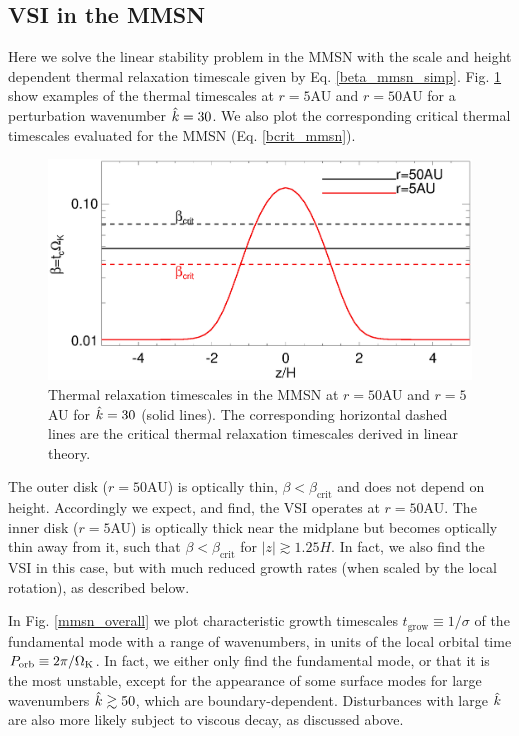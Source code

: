 {\subsection{VSI in the MMSN}
Here we solve the linear stability problem in the MMSN with the scale and
height dependent thermal relaxation timescale given by
Eq. \ref{beta_mmsn_simp}.  Fig. \ref{beta_compare} show examples of
the thermal timescales at $r=5$AU and $r=50$AU for a
perturbation wavenumber $\hat{k}=30$. We also plot the 
corresponding critical thermal timescales evaluated for the MMSN
(Eq. \ref{bcrit_mmsn}).  
 \begin{figure}
  \includegraphics[width=\linewidth,clip=true,trim=0cm 0cm 0cm
  0cm]{figures/beta_compare}
  \caption{Thermal relaxation timescales in the MMSN at $r=50$AU
    and $r=5$AU for $\hat{k}=30$ (solid lines). The
    corresponding horizontal dashed lines are the critical thermal
    relaxation timescales derived in linear theory. 
    \label{beta_compare}}
\end{figure}

The outer disk ($r=50$AU) is optically thin,
$\beta<\beta_\mathrm{crit}$  and  does not depend on height.
Accordingly we expect, and find, the VSI operates at $r=50$AU. The
inner disk ($r=5$AU) is optically thick near the midplane but becomes
optically thin away from it, such that $\beta < \beta_\mathrm{crit}$
for $|z|\gtrsim1.25H$. In fact, we also find the VSI in this case, but
with much reduced growth rates (when scaled by the local rotation), as
described below.     

In Fig. \ref{mmsn_overall} we plot characteristic growth timescales
$t_\mathrm{grow} \equiv 1/\sigma$ of the fundamental mode with a range of
wavenumbers, in units of the local orbital time $P_\mathrm{orb}\equiv
2\pi/\Omega_{\rm K}$. In fact, we either only find the fundamental mode, or 
that it is the most unstable, except for the appearance of some 
surface modes for large wavenumbers $\hat{k}\gtrsim 50$, which are 
boundary-dependent.  
Disturbances with large $\hat{k}$ are also more likely subject to viscous 
decay, as discussed above. 


}
